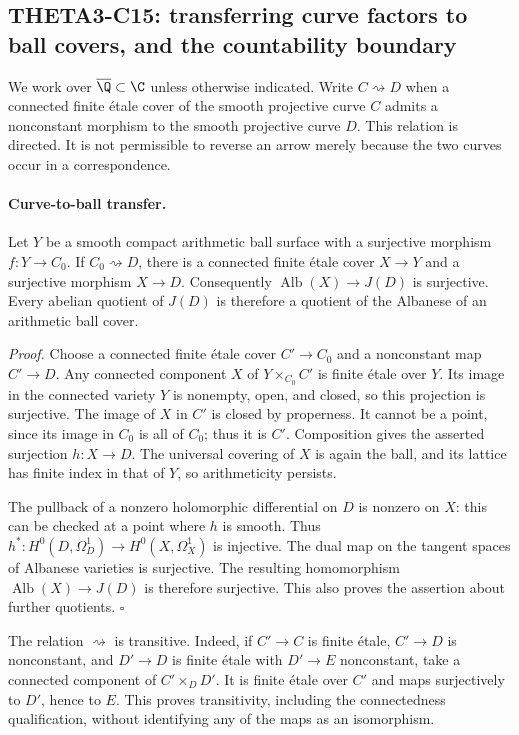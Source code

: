\subsection{THETA3-C15: transferring curve factors to ball covers, and the countability boundary}
\label{C15}

We work over $\overline{\Q}\subset\C$ unless otherwise indicated.  Write
$C\rightsquigarrow D$ when a connected finite \'{e}tale cover of the smooth
projective curve $C$ admits a nonconstant morphism to the smooth projective
curve $D$.  This relation is directed.  It is not permissible to reverse an
arrow merely because the two curves occur in a correspondence.

\paragraph{Curve-to-ball transfer.}
Let $Y$ be a smooth compact arithmetic ball surface with a surjective morphism
$f:Y\to C_0$.  If $C_0\rightsquigarrow D$, there is a connected finite
\'{e}tale cover $X\to Y$ and a surjective morphism $X\to D$.  Consequently
$\operatorname{Alb}(X)\to J(D)$ is surjective.  Every abelian quotient of
$J(D)$ is therefore a quotient of the Albanese of an arithmetic ball cover.

\emph{Proof.}
Choose a connected finite \'{e}tale cover $C'\to C_0$ and a nonconstant
map $C'\to D$.  Any connected component $X$ of $Y\times_{C_0}C'$ is finite
\'{e}tale over $Y$.  Its image in the connected variety $Y$ is nonempty,
open, and closed, so this projection is surjective.  The image of $X$ in
$C'$ is closed by properness.  It cannot be a point, since its image in
$C_0$ is all of $C_0$; thus it is $C'$.  Composition gives the asserted
surjection $h:X\to D$.  The universal covering of $X$ is again the ball,
and its lattice has finite index in that of $Y$, so arithmeticity persists.

The pullback of a nonzero holomorphic differential on $D$ is nonzero on
$X$: this can be checked at a point where $h$ is smooth.  Thus
$h^*:H^0(D,\Omega_D^1)\to H^0(X,\Omega_X^1)$ is injective.  The dual map
on the tangent spaces of Albanese varieties is surjective.  The resulting
homomorphism $\operatorname{Alb}(X)\to J(D)$ is therefore surjective.
This also proves the assertion about further quotients. \hfill$\square$

The relation $\rightsquigarrow$ is transitive.  Indeed, if
$C'\to C$ is finite \'{e}tale, $C'\to D$ is nonconstant, and
$D'\to D$ is finite \'{e}tale with $D'\to E$ nonconstant, take a connected
component of $C'\times_DD'$.  It is finite \'{e}tale over $C'$ and maps
surjectively to $D'$, hence to $E$.  This proves transitivity, including the
connectedness qualification, without identifying any of the maps as an
isomorphism.

